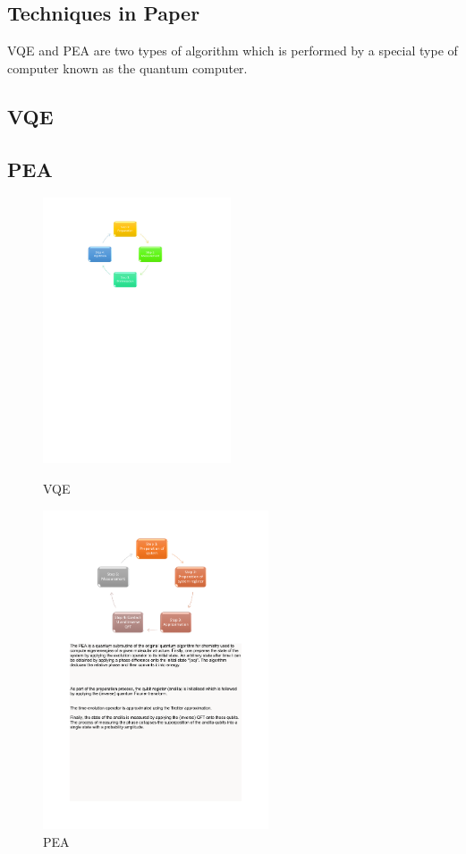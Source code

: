\documentclass[14pt,landscape,color=UCLdarkred,margin=3cm]{uclposter}
\begin{document}
\begin{multicols}{3}
\columnbreak

\section*{Techniques in Paper}
VQE and PEA are two types of algorithm which is performed by a special type of computer known as the quantum computer.

\subsection*{VQE}

\subsection*{PEA}


\begin{figure}[H]
  \begin{center}
  \begin{minipage}[c]{15em}
    
    \includegraphics[width=15em]{VQEdiagram.pdf}
    \caption{VQE}
  \end{minipage}
  \qquad
  \begin{minipage}[c]{18em}
    
    \includegraphics[width=18em]{PEA.pdf}
    \caption{PEA}
  \end{minipage}
  \end{center}


\end{figure}
\end{multicols}
\end{document}

